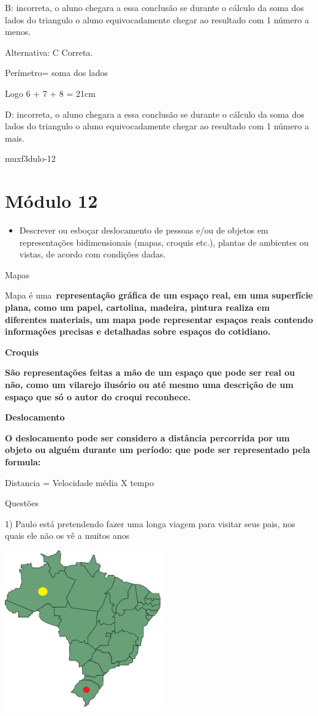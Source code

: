 {B: incorreta, o aluno chegara a essa conclusão se durante o cálculo da
soma dos lados do triangulo o aluno equivocadamente chegar ao resultado
com 1 número a menos.

Alternativa: C Correta.

Perímetro= soma dos lados

Logo 6 + 7 + 8 = 21cm

D: incorreta, o aluno chegara a essa conclusão se durante o cálculo da
soma dos lados do triangulo o aluno equivocadamente chegar ao resultado
com 1 número a mais.

muxf3dulo-12}{%
\section{Módulo 12}

\begin{itemize}
\tightlist
\item
  Descrever ou esboçar deslocamento de pessoas e/ou de objetos em
  representações bidimensionais (mapas, croquis etc.), plantas de
  ambientes ou vistas, de acordo com condições dadas.
\end{itemize}

Mapas

Mapa é uma~\textbf{representação gráfica de um espaço real, em uma
superfície plana, como um papel, cartolina, madeira, pintura realiza em
diferentes materiais, um mapa pode representar espaços reais contendo
informações precisas e detalhadas sobre espaços do cotidiano.}

\textbf{Croquis}

\textbf{São representações feitas a mão de um espaço que pode ser real
ou não, como um vilarejo ilusório ou até mesmo uma descrição de um
espaço que só o autor do croqui reconhece.}

\textbf{Deslocamento}

\textbf{O deslocamento pode ser considero a distância percorrida por um
objeto ou alguém durante um período: que pode ser representado pela
formula:}

Distancia = Velocidade média X tempo

Questões

1) Paulo está pretendendo fazer uma longa viagem para visitar seus pais,
nos quais ele não os vê a muitos anos

\includegraphics[width=2.73952in,height=2.725in]{./imgSAEB_8_MAT/media/image36.png}

}
